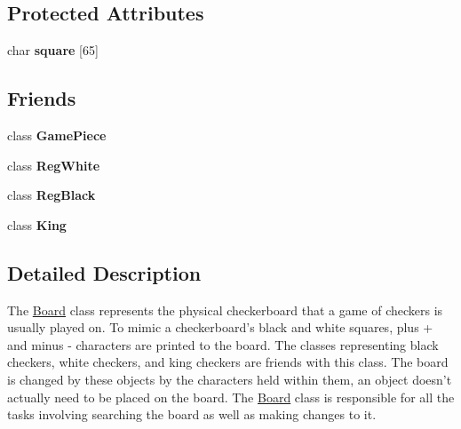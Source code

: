 \subsection*{Protected Attributes}
\begin{DoxyCompactItemize}
\item 
\hypertarget{class_board_ac3681603c987fc26f8c92f686f6771f3}{char {\bfseries square} \mbox{[}65\mbox{]}}\label{class_board_ac3681603c987fc26f8c92f686f6771f3}

\end{DoxyCompactItemize}
\subsection*{Friends}
\begin{DoxyCompactItemize}
\item 
\hypertarget{class_board_ab995b607204a3fc16276228c50c7784f}{class {\bfseries Game\-Piece}}\label{class_board_ab995b607204a3fc16276228c50c7784f}

\item 
\hypertarget{class_board_a0939d48ce34dc3c2c43e985becde0059}{class {\bfseries Reg\-White}}\label{class_board_a0939d48ce34dc3c2c43e985becde0059}

\item 
\hypertarget{class_board_a13f65c58c2d8e57345d4d58a043a27d0}{class {\bfseries Reg\-Black}}\label{class_board_a13f65c58c2d8e57345d4d58a043a27d0}

\item 
\hypertarget{class_board_aa6cf82643411ed9e0232886e11bd82f3}{class {\bfseries King}}\label{class_board_aa6cf82643411ed9e0232886e11bd82f3}

\end{DoxyCompactItemize}


\subsection{Detailed Description}
The \hyperlink{class_board}{Board} class represents the physical checkerboard that a game of checkers is usually played on. To mimic a checkerboard's black and white squares, plus + and minus -\/ characters are printed to the board. The classes representing black checkers, white checkers, and king checkers are friends with this class. The board is changed by these objects by the characters held within them, an object doesn't actually need to be placed on the board. The \hyperlink{class_board}{Board} class is responsible for all the tasks involving searching the board as well as making changes to it. 

